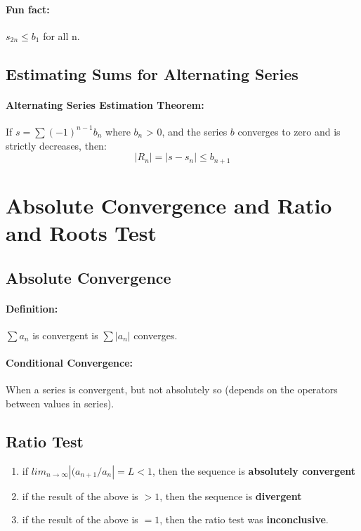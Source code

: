 \documentclass[a4paper,12pt]{report}
\begin{document}
\paragraph{Fun fact: } $s_{2n} \leq b_1$ for all n. 

\subsection{Estimating Sums for Alternating Series}
\paragraph{Alternating Series Estimation Theorem: } If $s = \sum (-1)^{n-1} b_n$ where $b_n$ > 0, and the series $b$ converges to zero and is strictly decreases, then:
$$ |R_n| = |s-s_n| \leq b_{n+1} $$

\section{Absolute Convergence and Ratio and Roots Test}
\subsection{Absolute Convergence}
\paragraph{Definition: } $\sum a_n$ is convergent is $\sum |a_n|$ converges.

\paragraph{Conditional Convergence: } When a series is convergent, but not absolutely so (depends on the operators between values in series).

\subsection{Ratio Test}
\begin{enumerate}
\item if $lim_{n\to\infty} |(a_{n+1}/a_n| = L < 1$, then the sequence is \textbf{absolutely convergent}
\item if the result of the above is $> 1$, then the sequence is \textbf{divergent}
\item if the result of the above is $= 1$, then the ratio test was \textbf{inconclusive}.
\end{enumerate}
\end{document}
